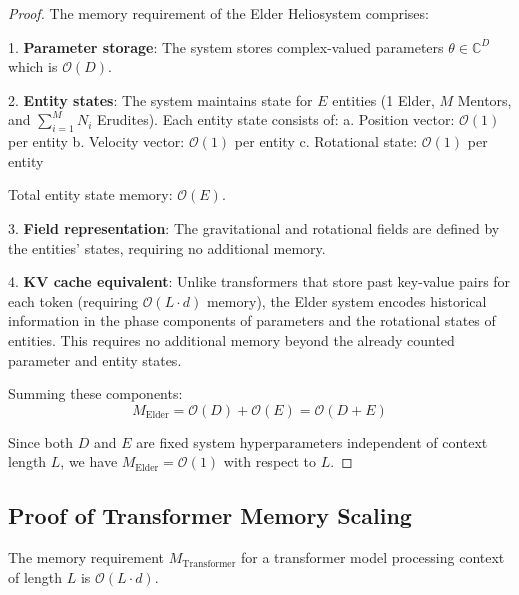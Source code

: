 \begin{proof}
The memory requirement of the Elder Heliosystem comprises:

1. \textbf{Parameter storage}: The system stores complex-valued parameters $\theta \in \mathbb{C}^D$ which is $\mathcal{O}(D)$.

2. \textbf{Entity states}: The system maintains state for $E$ entities (1 Elder, $M$ Mentors, and $\sum_{i=1}^M N_i$ Erudites). Each entity state consists of:
   a. Position vector: $\mathcal{O}(1)$ per entity
   b. Velocity vector: $\mathcal{O}(1)$ per entity
   c. Rotational state: $\mathcal{O}(1)$ per entity
   
   Total entity state memory: $\mathcal{O}(E)$.

3. \textbf{Field representation}: The gravitational and rotational fields are defined by the entities' states, requiring no additional memory.

4. \textbf{KV cache equivalent}: Unlike transformers that store past key-value pairs for each token (requiring $\mathcal{O}(L \cdot d)$ memory), the Elder system encodes historical information in the phase components of parameters and the rotational states of entities. This requires no additional memory beyond the already counted parameter and entity states.

Summing these components:
\begin{equation}
M_{\text{Elder}} = \mathcal{O}(D) + \mathcal{O}(E) = \mathcal{O}(D + E)
\end{equation}

Since both $D$ and $E$ are fixed system hyperparameters independent of context length $L$, we have $M_{\text{Elder}} = \mathcal{O}(1)$ with respect to $L$.
\end{proof}

\subsection{Proof of Transformer Memory Scaling}

\begin{theorem}
The memory requirement $M_{\text{Transformer}}$ for a transformer model processing context of length $L$ is $\mathcal{O}(L \cdot d)$.
\end{theorem}

